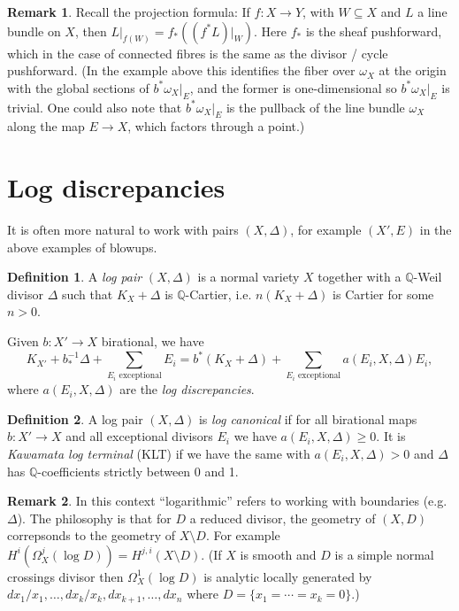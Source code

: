 \documentclass{article}
\theoremstyle{definition}
\newtheorem*{definition}{Definition}
\newtheorem*{remark}{Remark}
\newcommand{\Q}{\mathbb{Q}}
\begin{document}
\begin{remark}
    Recall the projection formula: If $f:X\to Y$, with $W\subseteq X$ and $L$ a
    line bundle on $X$, then $L|_{f(W)}=f_*((f^*L)|_W)$. Here $f_*$ is the sheaf
    pushforward, which in the case of connected fibres is the same as the
    divisor / cycle pushforward. (In the example above this identifies the
    fiber over $\omega_X$ at the origin with the global sections of
    $b^*\omega_X|_E$, and the former is one-dimensional so $b^*\omega_X|_E$ is
    trivial. One could also note that $b^*\omega_X|_E$ is the pullback of the
    line bundle $\omega_X$ along the map $E\to X$, which factors through a
    point.)
\end{remark}

\section*{Log discrepancies}

It is often more natural to work with pairs $(X,\Delta)$, for example $(X',E)$
in the above examples of blowups.

\begin{definition}
    A \emph{log pair} $(X,\Delta)$ is a normal variety $X$ together with
    a $\Q$-Weil divisor $\Delta$ such that $K_X+\Delta$ is $\Q$-Cartier, i.e.
    $n(K_X+\Delta)$ is Cartier for some $n>0$.
\end{definition}

Given $b:X'\to X$ birational, we have
\begin{equation*}
    K_{X'} + b_*^{-1}\Delta + \sum_{\text{$E_i$ exceptional}}E_i
    = b^*(K_X+\Delta) + \sum_{\text{$E_i$ exceptional}}a(E_i,X,\Delta)E_i,
\end{equation*}
where $a(E_i,X,\Delta)$ are the \emph{log discrepancies}.

\begin{definition}
    A log pair $(X,\Delta)$ is \emph{log canonical} if for all birational maps
    $b:X'\to X$ and all exceptional divisors $E_i$ we have
    $a(E_i,X,\Delta)\ge0$. It is \emph{Kawamata log terminal} (KLT) if we have
    the same with $a(E_i,X,\Delta)>0$ and $\Delta$ has $\Q$-coefficients
    strictly between 0 and 1.
\end{definition}

\begin{remark}
    In this context ``logarithmic'' refers to working with boundaries (e.g.
    $\Delta$). The philosophy is that for $D$ a reduced divisor, the geometry of
    $(X,D)$ correpsonds to the geometry of $X\setminus D$. For example
    $H^i(\Omega^j_X(\log D))=H^{j,i}(X\setminus D)$. (If $X$ is smooth and $D$
    is a simple normal crossings divisor then $\Omega^1_X(\log D)$ is analytic
    locally generated by $dx_1/x_1,\ldots,dx_k/x_k,dx_{k+1},\ldots,dx_n$ where
    $D=\{x_1=\cdots=x_k=0\}$.)
\end{remark}
\end{document}
